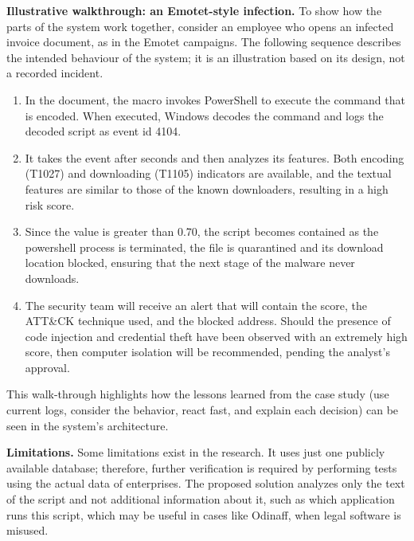 \documentclass[12pt,a4paper]{article}
\newcommand{\attck}{ATT\&CK}
\newcommand{\head}[1]{\noindent\textbf{#1}\quad}
\begin{document}
\head{Illustrative walkthrough: an Emotet-style infection.} To show how the parts of the system work together, consider an employee who opens an infected invoice document, as in the Emotet campaigns. The following sequence describes the intended behaviour of the system; it is an illustration based on its design, not a recorded incident.
\begin{enumerate}
  \item In the document, the macro invokes PowerShell to execute the command that is encoded. When executed, Windows decodes the command and logs the decoded script as event id 4104.
  \item It takes the event after seconds and then analyzes its features. Both encoding (T1027) and downloading (T1105) indicators are available, and the textual features are similar to those of the known downloaders, resulting in a high risk score.
  \item Since the value is greater than 0.70, the script becomes contained as the powershell process is terminated, the file is quarantined and its download location blocked, ensuring that the next stage of the malware never downloads.
  \item The security team will receive an alert that will contain the score, the \attck{} technique used, and the blocked address. Should the presence of code injection and credential theft have been observed with an extremely high score, then computer isolation will be recommended, pending the analyst's approval.
\end{enumerate}
This walk-through highlights how the lessons learned from the case study (use current logs, consider the behavior, react fast, and explain each decision) can be seen in the system's architecture.

\head{Limitations.} Some limitations exist in the research. It uses just one publicly available database; therefore, further verification is required by performing tests using the actual data of enterprises. The proposed solution analyzes only the text of the script and not additional information about it, such as which application runs this script, which may be useful in cases like Odinaff, when legal software is misused.
\end{document}
